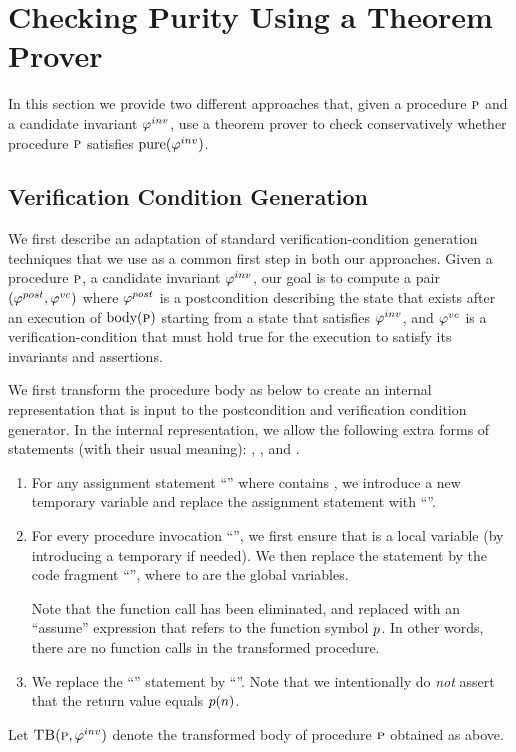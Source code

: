 \newcommand{\existformula}{\psi^e}
\newcommand{\EA}{\textsc{ea}}
\newcommand{\IW}{\textsc{iw}}

\newcommand{\initformula}{\logicalformula{init}}

\section{Checking Purity Using a Theorem Prover}
\label{sec:vcgen}

In this section we provide two different approaches that, given a procedure
$\textsc{p}$ and a candidate invariant $\varphi^{inv}$, use a theorem prover to check
conservatively whether procedure $\textsc{p}$ satisfies $\mathrm{pure}(\varphi^{inv})$.



\subsection{Verification Condition Generation}

We first describe an adaptation of standard verification-condition generation
techniques that we use as a common first step in both our approaches.
Given a procedure $\textsc{p}$, a candidate invariant $\varphi^{inv}$, our goal is to compute a
pair $(\varphi^{post},\varphi^{vc})$ where $\varphi^{post}$ is a postcondition describing the state that exists after an execution of
$\text{body}(\textsc{p})$ starting from a state that satisfies $\varphi^{inv}$, and $\varphi^{vc}$ is a verification-condition that must hold true
for the execution to satisfy its invariants and assertions.

We first transform the procedure body as below to create an internal representation that is input to the
postcondition and verification condition generator. In the internal representation, we allow the following
extra forms of statements (with their usual meaning): , , and  .
\begin{enumerate}
\item For any assignment statement ``'' where  contains , we introduce a new temporary
variable  and replace the assignment statement with ``''.
\item For every procedure invocation ``'', we first ensure that  is a local variable (by introducing
a temporary if needed). We then replace the statement by the code fragment
``'',
where  to  are the global variables.

Note that the
function call has been eliminated, and replaced with an ``assume''
expression that refers to the function symbol $p$. In other words,
there are no function calls in the transformed procedure.
\item We replace the ``'' statement by ``''.
Note that we intentionally do \emph{not} assert that the return value equals $p(n)$.
\end{enumerate}
Let $\textsc{TB}(\textsc{p}, \varphi^{inv})$ denote the transformed body of procedure $\textsc{p}$ obtained as above.

